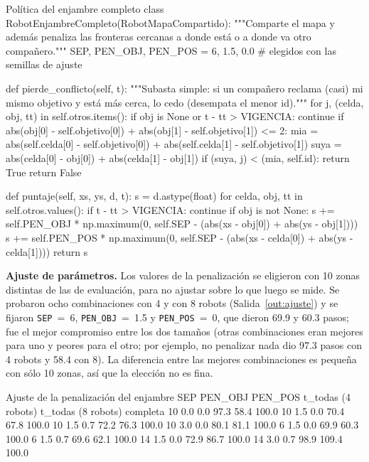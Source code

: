 \documentclass[11pt,letterpaper]{article}
\begin{document}
\begin{codigo}[label=cod:enjambre]{Política del enjambre completo}
class RobotEnjambreCompleto(RobotMapaCompartido):
    """Comparte el mapa y además penaliza las fronteras cercanas a donde está o a donde va otro compañero."""
    SEP, PEN_OBJ, PEN_POS = 6, 1.5, 0.0     # elegidos con las semillas de ajuste

    def pierde_conflicto(self, t):
        """Subasta simple: si un compañero reclama (casi) mi mismo objetivo y está más cerca, lo cedo (desempata el menor id)."""
        for j, (celda, obj, tt) in self.otros.items():
            if obj is None or t - tt > VIGENCIA:
                continue
            if abs(obj[0] - self.objetivo[0]) + abs(obj[1] - self.objetivo[1]) <= 2:
                mia = abs(self.celda[0] - self.objetivo[0]) + abs(self.celda[1] - self.objetivo[1])
                suya = abs(celda[0] - obj[0]) + abs(celda[1] - obj[1])
                if (suya, j) < (mia, self.id):
                    return True
        return False

    def puntaje(self, xs, ys, d, t):
        s = d.astype(float)
        for celda, obj, tt in self.otros.values():
            if t - tt > VIGENCIA:
                continue
            if obj is not None:
                s += self.PEN_OBJ * np.maximum(0, self.SEP - (abs(xs - obj[0]) + abs(ys - obj[1])))
            s += self.PEN_POS * np.maximum(0, self.SEP - (abs(xs - celda[0]) + abs(ys - celda[1])))
        return s
\end{codigo}

\textbf{Ajuste de parámetros.} Los valores de la penalización se eligieron con 10 zonas distintas de las de evaluación, para no ajustar sobre lo que luego se mide. Se probaron ocho combinaciones con 4 y con 8 robots (Salida~\ref{out:ajuste}) y se fijaron \texttt{SEP}~=~6, \texttt{PEN\_OBJ}~=~1.5 y \texttt{PEN\_POS}~=~0, que dieron 69.9 y 60.3 pasos; fue el mejor compromiso entre los dos tamaños (otras combinaciones eran mejores para uno y peores para el otro; por ejemplo, no penalizar nada dio 97.3 pasos con 4 robots y 58.4 con 8). La diferencia entre las mejores combinaciones es pequeña con sólo 10 zonas, así que la elección no es fina.

\begin{consola}[label=out:ajuste]{Ajuste de la penalización del enjambre}
 SEP  PEN_OBJ  PEN_POS  t_todas (4 robots)  t_todas (8 robots)  completa %
  10      0.0      0.0                97.3                58.4           100.0
  10      1.5      0.0                70.4                67.8           100.0
  10      1.5      0.7                72.2                76.3           100.0
  10      3.0      0.0                80.1                81.1           100.0
   6      1.5      0.0                69.9                60.3           100.0
   6      1.5      0.7                69.6                62.1           100.0
  14      1.5      0.0                72.9                86.7           100.0
  14      3.0      0.7                98.9               109.4           100.0
\end{consola}
\end{document}
